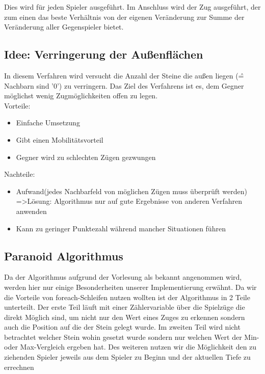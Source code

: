 \documentclass[12pt,a4paper,bibliography=totocnumbered,listof=totocnumbered]{scrartcl}
\begin{document}
Dies wird für jeden Spieler ausgeführt. Im Anschluss wird der Zug ausgeführt, der zum einen das beste Verhältnis von der eigenen Veränderung zur Summe der Veränderung aller Gegenspieler bietet.


\pagebreak

\subsection{Idee: Verringerung der Außenflächen}
In diesem Verfahren wird versucht die Anzahl der Steine die außen liegen (\^= Nachbarn sind '0') zu verringern.
Das Ziel des Verfahrens ist es, dem Gegner möglichst wenig Zugmöglichkeiten offen zu legen. \\
Vorteile: 

\begin{itemize}
	\item Einfache Umsetzung
	\item Gibt einen Mobilitätsvorteil
	\item Gegner wird zu schlechten Zügen gezwungen
\end{itemize}

Nachteile: 

\begin{itemize}
	\item Aufwand(jedes Nachbarfeld von möglichen Zügen muss überprüft werden) \\
	=\textgreater  Lösung: Algorithmus nur auf gute Ergebnisse von anderen Verfahren anwenden
	\item Kann zu geringer Punktezahl während mancher Situationen führen
\end{itemize}

\pagebreak
\subsection{Paranoid Algorithmus}
Da der Algorithmus aufgrund der Vorlesung als bekannt angenommen wird, werden hier nur einige Besonderheiten unserer Implementierung erwähnt.
Da wir die Vorteile von foreach-Schleifen nutzen wollten ist der Algorithmus in 2 Teile unterteilt. Der erste Teil läuft mit einer Zählervariable über die Spielzüge die direkt Möglich sind, um nicht nur den Wert eines Zuges zu erkennen sondern auch die Position auf die der Stein gelegt wurde. Im zweiten Teil wird nicht betrachtet welcher Stein wohin gesetzt wurde sondern nur welchen Wert der Min- oder Max-Vergleich ergeben hat.
Des weiteren nutzen wir die Möglichkeit den zu ziehenden Spieler jeweils aus dem Spieler zu Beginn und der aktuellen  Tiefe zu errechnen
\pagebreak
\end{document}
